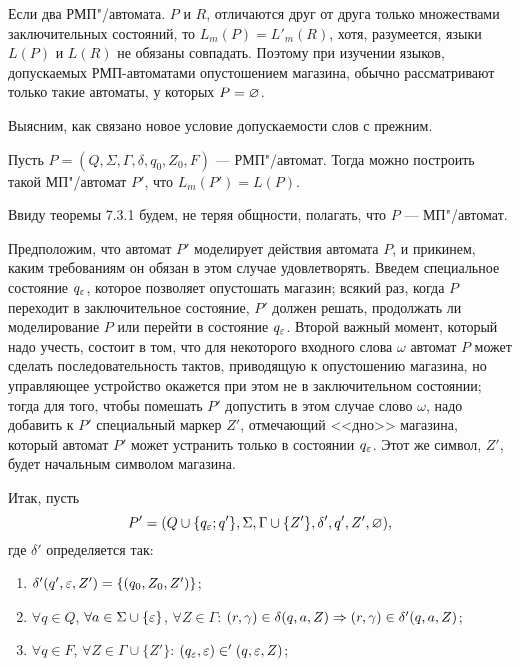 Если два РМП"/автомата. $P$ и $R$, отличаются друг от друга только множествами заключительных состояний, то $L_m(P)=L'_m(R)$, хотя, разумеется, языки $L(P)$ и $L(R)$ не обязаны совпадать. Поэтому при изучении языков, допускаемых РМП-автоматами опустошением магазина, обычно рассматривают только такие автоматы, у которых $P=\varnothing$.

Выясним, как связано новое условие допускаемости слов с прежним.

\begin{mytheorem}
Пусть $P=(Q,\Sigma,\Gamma,\delta,q_0,Z_0,F)$ --- РМП"/автомат. Тогда можно построить такой МП"/автомат $P'$, что $L_m(P')=L(P)$.
\end{mytheorem}

\begin{myproof}
Ввиду теоремы 7.3.1 будем, не теряя общности, полагать, что $P$ --- МП"/автомат.

Предположим, что автомат $P'$ моделирует действия автомата $P$, и прикинем, каким требованиям он обязан в этом случае удовлетворять. Введем специальное состояние $q_\varepsilon$, которое позволяет опустошать магазин; всякий раз, когда $P$ переходит в заключительное состояние, $P'$ должен решать, продолжать ли моделирование $P$ или перейти в состояние $q_\varepsilon$. Второй важный момент, который надо учесть, состоит в том, что для некоторого входного слова $\omega$ автомат $P$ может сделать последовательность тактов, приводящую к опустошению магазина, но управляющее устройство окажется при этом не в заключительном состоянии; тогда для того, чтобы помешать $P'$ допустить в этом случае слово $\omega$, надо добавить к $P'$ специальный маркер $Z'$, отмечающий <<дно>> магазина, который автомат $P'$ может устранить только в состоянии $q_\varepsilon$. Этот же символ, $Z'$, будет начальным символом магазина.

Итак, пусть
\[
P' = (Q\cup\{q_\varepsilon;q'\},\Sigma,\Gamma\cup\{Z'\},\delta',q',Z',\varnothing),
\]
где $\delta'$ определяется так:
\begin{enumerate}
    \item $\delta'(q',\varepsilon,Z')=\{(q_0,Z_0,Z')\}$;

    \item $\forall q\in Q$, $\forall a\in\Sigma\cup\{\varepsilon\}$,
    $\forall Z\in\Gamma$:
        $(r,\gamma)\in\delta(q,a,Z) \Rightarrow (r,\gamma)\in\delta'(q,a,Z)$;

    \item $\forall q\in F$, $\forall Z\in\Gamma\cup\{Z'\}$:
        $(q_\varepsilon,\varepsilon)\in'(q,\varepsilon,Z)$;


\end{enumerate}
\end{myproof}
